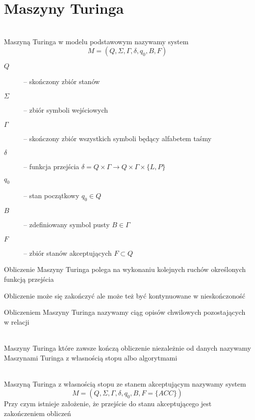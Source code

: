 \section{Maszyny Turinga}
\begin{df}~\\
	Maszyną Turinga w modelu podstawowym nazywamy system 
	\begin{equation}
		M = (Q, \Sigma, \Gamma, \delta, q_0, B, F)
	\end{equation}
	\begin{description}
		\item[$Q$] -- skończony zbiór stanów
		\item[$\Sigma$] -- zbiór symboli wejściowych
		\item[$\Gamma$] -- skończony zbiór wszystkich symboli będący alfabetem taśmy
		\item[$\delta$] -- funkcja przejścia $\delta = Q\times\Gamma \rightarrow Q\times\Gamma\times\{L,P\}$
		\item[$q_0$] -- stan początkowy $q_0 \in Q$
		\item[$B$] -- zdefiniowany symbol pusty $B\in\Gamma$
		\item[$F$] -- zbiór stanów akceptujących $F\subset Q$
	\end{description}
	\begin{uwaga}
		Obliczenie Maszyny Turinga polega na wykonaniu kolejnych ruchów określonych funkcją przejścia
	\end{uwaga}		
	\begin{uwaga}
		Obliczenie może się zakończyć ale może też być kontynuowane w nieskończoność
	\end{uwaga}
\end{df}

\begin{df}
	Obliczeniem Maszyny Turinga nazywamy ciąg opisów chwilowych pozostających w relacji
\end{df}

\begin{df}~\\
	Maszyny Turinga które zawsze kończą obliczenie niezależnie od danych nazywamy Maszynami Turinga 
	z własnością stopu albo algorytmami
\end{df}

\begin{df}~\\
	Maszyną Turinga z własnością stopu ze stanem akceptującym nazywamy system
	\begin{equation}
		M = (Q, \Sigma, \Gamma, \delta, q_0, B, F = \{ACC\})
	\end{equation}
	Przy czym istnieje założenie, że przejście do stanu akceptującego jest zakończeniem obliczeń
\end{df}

